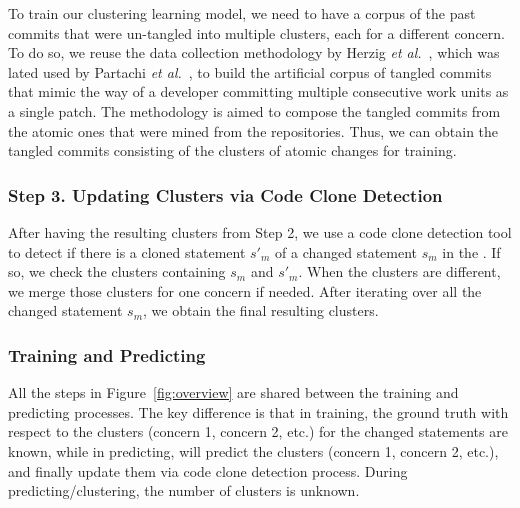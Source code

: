  To train our clustering learning
model, we need to have a corpus of the past commits that were
un-tangled into multiple clusters, each for a different concern. To do
so, we reuse the data collection methodology by Herzig {\em et
  al.}~\cite{kim-emse16}, which was lated used by Partachi {\em et
  al.}~\cite{flexeme-fse20}, to build the artificial corpus of tangled
commits that mimic the way of a developer committing multiple
consecutive work units as a single patch. The methodology is aimed to
compose the tangled commits from the atomic ones that were mined from
the repositories. Thus, we can obtain the tangled commits consisting
of the clusters of atomic changes for training.




\subsubsection{{\bf Step 3. Updating Clusters via Code Clone Detection}}

After having the resulting clusters from Step 2, we use a code clone
detection tool to detect if there is a cloned statement $s'_m$ of a
changed statement $s_m$ in the {\mvpdg}. If so, we check the clusters
containing $s_m$ and $s'_m$. When the clusters are different, we merge
those clusters for one concern if needed. After iterating over all the
changed statement $s_m$, we obtain the final resulting clusters.


\subsubsection*{Training and Predicting}
All the steps in Figure~\ref{fig:overview} are shared between the
training and predicting processes. The key difference is that in
training, the ground truth with respect to the clusters (concern 1,
concern 2, etc.) for the changed statements are known, while in
predicting, {\tool} will predict the clusters (concern 1, concern 2,
etc.), and finally update them via code clone detection process. During
predicting/clustering, the number of clusters is unknown.


